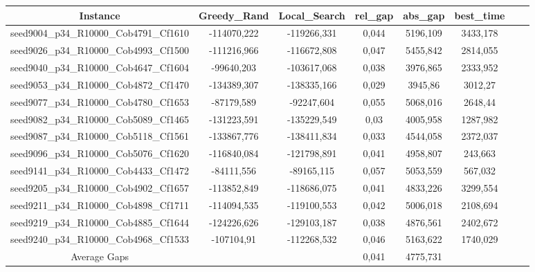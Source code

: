 \documentclass[a4paper]{article}
\begin{document}
\begin{center}
\begin{longtable}{cccccccc}
\tabularnewline
\hline
Instance & Greedy\_Rand & Local\_Search & rel\_gap & abs\_gap & best\_time\\
\hline
seed9004\_p34\_R10000\_Cob4791\_Cf1610 & -114070,222 & -119266,331 & 0,044 & 5196,109 & 3433,178\\
\hline
seed9026\_p34\_R10000\_Cob4993\_Cf1500 & -111216,966 & -116672,808 & 0,047 & 5455,842 & 2814,055\\
\hline
seed9040\_p34\_R10000\_Cob4647\_Cf1604 & -99640,203 & -103617,068 & 0,038 & 3976,865 & 2333,952\\
\hline
seed9053\_p34\_R10000\_Cob4872\_Cf1470 & -134389,307 & -138335,166 & 0,029 & 3945,86 & 3012,27\\
\hline
seed9077\_p34\_R10000\_Cob4780\_Cf1653 & -87179,589 & -92247,604 & 0,055 & 5068,016 & 2648,44\\
\hline
seed9082\_p34\_R10000\_Cob5089\_Cf1465 & -131223,591 & -135229,549 & 0,03 & 4005,958 & 1287,982\\
\hline
seed9087\_p34\_R10000\_Cob5118\_Cf1561 & -133867,776 & -138411,834 & 0,033 & 4544,058 & 2372,037\\
\hline
seed9096\_p34\_R10000\_Cob5076\_Cf1620 & -116840,084 & -121798,891 & 0,041 & 4958,807 & 243,663\\
\hline
seed9141\_p34\_R10000\_Cob4433\_Cf1472 & -84111,556 & -89165,115 & 0,057 & 5053,559 & 567,032\\
\hline
seed9205\_p34\_R10000\_Cob4902\_Cf1657 & -113852,849 & -118686,075 & 0,041 & 4833,226 & 3299,554\\
\hline
seed9211\_p34\_R10000\_Cob4898\_Cf1711 & -114094,535 & -119100,553 & 0,042 & 5006,018 & 2108,694\\
\hline
seed9219\_p34\_R10000\_Cob4885\_Cf1644 & -124226,626 & -129103,187 & 0,038 & 4876,561 & 2402,672\\
\hline
seed9240\_p34\_R10000\_Cob4968\_Cf1533 & -107104,91 & -112268,532 & 0,046 & 5163,622 & 1740,029\\
\hline
\hline
Average Gaps & & & 0,041 & 4775,731 &  \\
\hline
\hline
\end{longtable}
\end{center}
\end{document}
